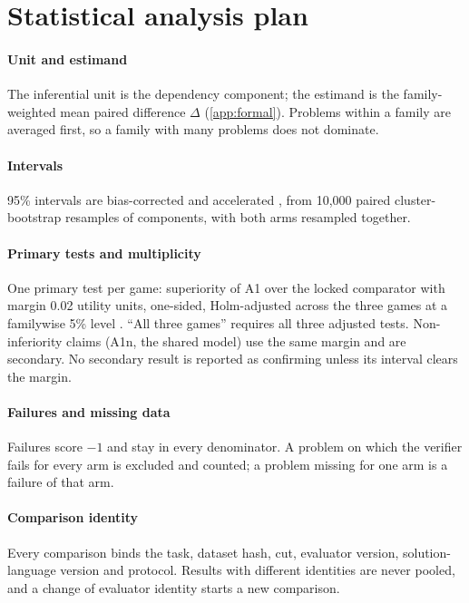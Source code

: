 \section{Statistical analysis plan}
\label{app:statistics}

\paragraph{Unit and estimand} The inferential unit is the dependency component; the estimand is the
family-weighted mean paired difference $\Delta$ (\cref{app:formal}). Problems within a family are
averaged first, so a family with many problems does not dominate.

\paragraph{Intervals} 95\% intervals are bias-corrected and accelerated \citep{efron1987bca}, from
10,000 paired cluster-bootstrap resamples of components, with both arms resampled together.

\paragraph{Primary tests and multiplicity} One primary test per game: superiority of A1 over the
locked comparator with margin 0.02 utility units, one-sided, Holm-adjusted across the three games at a
familywise 5\% level \citep{holm1979}. ``All three games'' requires all three adjusted tests.
Non-inferiority claims (A1n, the shared model) use the same margin and are secondary. No secondary
result is reported as confirming unless its interval clears the margin.

\paragraph{Failures and missing data} Failures score $-1$ and stay in every denominator. A problem on
which the verifier fails for every arm is excluded and counted; a problem missing for one arm is a
failure of that arm.

\paragraph{Comparison identity} Every comparison binds the task, dataset hash, cut, evaluator
version, solution-language version and protocol. Results with different identities are never pooled,
and a change of evaluator identity starts a new comparison.


